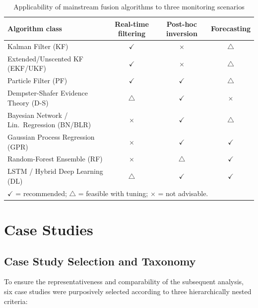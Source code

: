 \documentclass[preprint,11pt,authoryear,3p]{elsarticle}
\newcommand{\cmark}{\(\checkmark\)} %
\newcommand{\tmark}{\(\triangle\)}   %
\newcommand{\xmark}{$\times$}          %
\begin{document}
\begin{table}[htbp]
\centering
\caption{Applicability of mainstream fusion algorithms to three monitoring scenarios}
\label{tab:applicability}
\begin{tabular}{p{5cm}ccc}
\toprule
\textbf{Algorithm class} & \textbf{Real-time filtering} & \textbf{Post-hoc inversion} & \textbf{Forecasting}\\
\midrule
Kalman Filter (KF)                         & \cmark  & \xmark  & \tmark \\
Extended/Unscented KF (EKF/UKF)            & \cmark  & \xmark  & \tmark \\
Particle Filter (PF)                       & \cmark  & \cmark  & \tmark \\
Dempster-Shafer Evidence Theory (D-S)      & \tmark  & \cmark  & \xmark \\
Bayesian Network / Lin.\ Regression (BN/BLR) & \xmark & \cmark & \tmark \\
Gaussian Process Regression (GPR)          & \xmark  & \cmark  & \cmark \\
Random-Forest Ensemble (RF)                & \xmark  & \tmark  & \cmark \\
LSTM / Hybrid Deep Learning (DL)           & \tmark  & \cmark  & \cmark \\
\bottomrule
\multicolumn{4}{l}{\footnotesize \cmark{} = recommended;\; \tmark{} = feasible with tuning;\; \xmark{} = not advisable.}
\end{tabular}
\end{table}

\section{Case Studies}

\subsection{Case Study Selection and Taxonomy}
\label{subsec:case_selection}

To ensure the representativeness and comparability of the subsequent analysis, six case studies were purposively selected according to three hierarchically nested criteria:
\end{document}
